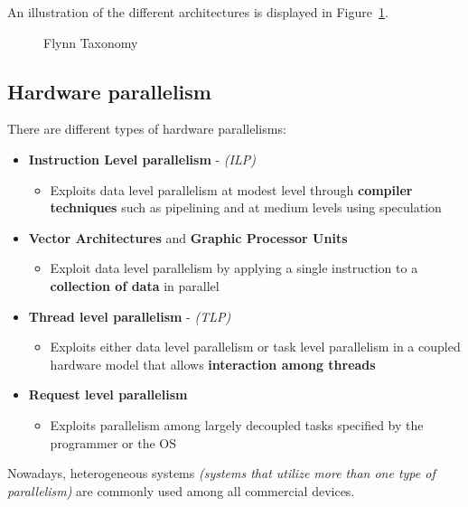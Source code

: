 \documentclass[english]{article}
\begin{document}
\bigskip
An illustration of the different architectures is displayed in Figure~\ref{fig:flynn-taxonomy}.

\begin{figure}[htbp]
  \bigskip
  \centering
  \caption{Flynn Taxonomy}
  \label{fig:flynn-taxonomy}
  \bigskip
\end{figure}

\subsection{Hardware parallelism}

There are different types of hardware parallelisms:

\begin{itemize}
  \item \textbf{Instruction Level parallelism} - \textit{(ILP)}
        \begin{itemize}
          \item Exploits data level parallelism at modest level through \textbf{compiler techniques} such as pipelining and at medium levels using speculation
        \end{itemize}
  \item \textbf{Vector Architectures} and \textbf{Graphic Processor Units}
        \begin{itemize}
          \item Exploit data level parallelism by applying a single instruction to a \textbf{collection of data} in parallel
        \end{itemize}
  \item \textbf{Thread level parallelism} - \textit{(TLP)}
        \begin{itemize}
          \item Exploits either data level parallelism or task level parallelism in a coupled hardware model that allows \textbf{interaction among threads}
        \end{itemize}
  \item \textbf{Request level parallelism}
        \begin{itemize}
          \item Exploits parallelism among largely decoupled tasks specified by the programmer or the OS
        \end{itemize}
\end{itemize}

Nowadays, heterogeneous systems \textit{(systems that utilize more than one type of parallelism)} are commonly used among all commercial devices.
\end{document}
